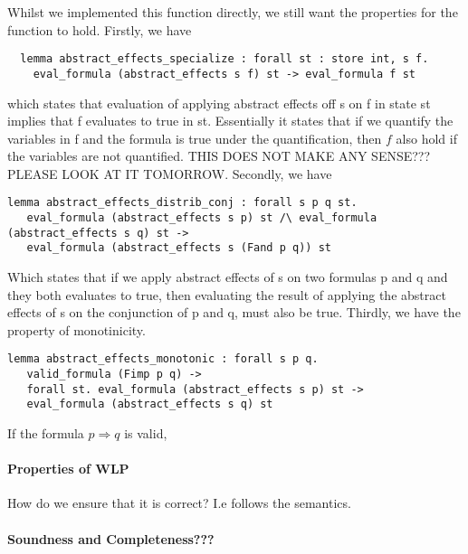 Whilst we implemented this function directly, we still want the properties for the function to hold.
Firstly, we have

\begin{lstlisting}
  lemma abstract_effects_specialize : forall st : store int, s f.
    eval_formula (abstract_effects s f) st -> eval_formula f st
\end{lstlisting}

which states that evaluation of applying abstract effects off s on f in state st implies that f evaluates to true in st. Essentially it states that if we quantify the variables in f and the formula is true under the quantification, then $f$ also hold if the variables are not quantified.
THIS DOES NOT MAKE ANY SENSE??? PLEASE LOOK AT IT TOMORROW.
Secondly, we have
\begin{lstlisting}
lemma abstract_effects_distrib_conj : forall s p q st.
   eval_formula (abstract_effects s p) st /\ eval_formula (abstract_effects s q) st ->
   eval_formula (abstract_effects s (Fand p q)) st
 \end{lstlisting}

Which states that if we apply abstract effects of s on two formulas p and q and they both evaluates to true,
then evaluating the result of applying the abstract effects of s on the conjunction of p and q, must also be true.
Thirdly, we have the property of monotinicity.

\begin{lstlisting}
lemma abstract_effects_monotonic : forall s p q.
   valid_formula (Fimp p q) ->
   forall st. eval_formula (abstract_effects s p) st ->
   eval_formula (abstract_effects s q) st
 \end{lstlisting}

If the formula $p \Rightarrow q$ is valid,



\paragraph{Properties of WLP}
How do we ensure that it is correct? I.e follows the semantics.


\paragraph{Soundness and Completeness???}